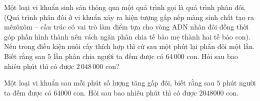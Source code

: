 \begin{bt}%
    Một loại vi khuẩn sinh sản thông qua một quá trình gọi là quá trình phân đôi. (Quá trình phân đôi ở vi khuẩn xảy ra hiện tượng gấp nếp màng sinh chất tạo ra mêzôxôm – cấu trúc có vai trò làm điểm tựa cho vòng ADN nhân đôi đồng thời góp phần hình thành nên vách ngăn phân chia tế bào mẹ thành hai tế bào con). Nếu trong điều kiện nuôi cấy thích hợp thì cứ sau một phút lại phân đôi một lần. Biết rằng sau $5$ lần phân chia người ta đếm được có $64\,000$ con. Hỏi sau bao nhiêu phút thì có được $2\,048\,000$ con?
\end{bt}

\begin{bt}%
Một loại vi khuẩn sau mỗi phút số lượng tăng gấp đôi, biết rằng sau $5$ phút người ta đếm được có $64000$ con. Hỏi sau bao nhiêu phút thì có được $2048000$ con.
\end{bt}

